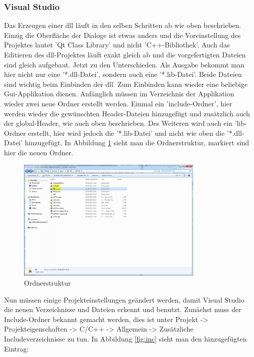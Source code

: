 \subsubsection{Visual Studio}
Das Erzeugen einer dll läuft in den selben Schritten ab wie oben beschrieben. Einzig die Oberfläche der Dialoge ist etwas anders und die Voreinstellung des Projektes lautet 'Qt Class Library' und nicht 'C++-Bibliothek'. \newline
Auch das Editieren des dll-Projektes läuft exakt gleich ab und die vorgefertigten Dateien sind gleich aufgebaut. Jetzt zu den Unterschieden. Als Ausgabe bekommt man hier nicht nur eine '*.dll-Datei', sondern auch eine '*.lib-Datei'. Beide Dateien sind wichtig beim Einbinden der dll. \newline
\newline
Zum Einbinden kann wieder eine beliebige Gui-Applikation dienen. Anfänglich müssen im Verzeichnis der Applikation wieder zwei neue Ordner erstellt werden. Einmal ein 'include-Ordner', hier werden wieder die gewünschten Header-Dateien hinzugefügt und zusätzlich auch der global-Header, wie auch oben beschrieben. Des Weiteren wird auch ein 'lib-Ordner erstellt, hier wird jedoch die '*.lib-Datei' und nicht wie oben die '*.dll-Datei' hinzugefügt. In Abbildung \ref{fig:ordner} sieht man die Ordnerstruktur, markiert sind hier die neuen Ordner.
\begin{figure}[H]
 	\centering
 	\includegraphics[width=0.80\textwidth]{figures/vsOrdner.png}
 	\caption{Ordnerstruktur}
 	\label{fig:ordner}
\end{figure}
Nun müssen einige Projekteinstellungen geändert werden, damit Visual Studio die neuen Verzeichnisse und Dateien erkennt und benutzt. Zunächst muss der Include-Ordner bekannt gemacht werden, dies ist unter Projekt -> Projekteigenschaften -> C/C++ -> Allgemein -> Zusätzliche Includeverzeichnisse zu tun. In Abbildung \ref{fig:inc} sieht man den hinzugefügten Eintrag:
